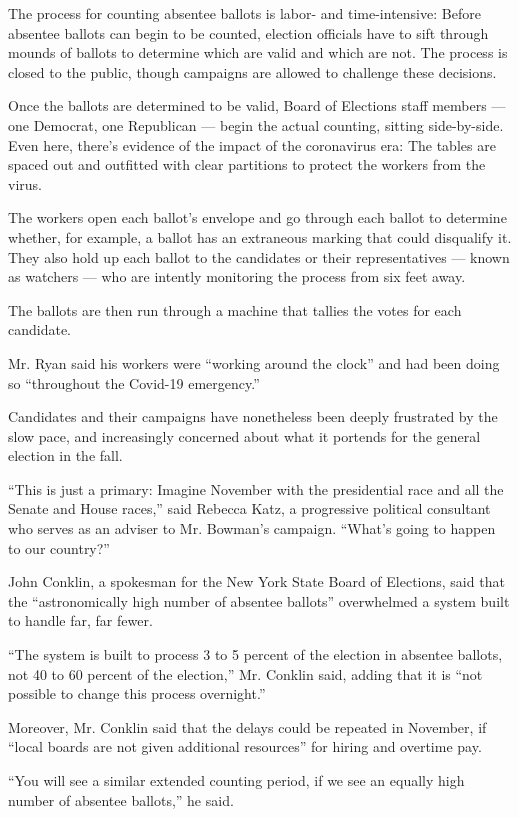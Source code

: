 The process for counting absentee ballots is labor- and time-intensive:
Before absentee ballots can begin to be counted, election officials have
to sift through mounds of ballots to determine which are valid and which
are not. The process is closed to the public, though campaigns are
allowed to challenge these decisions.

Once the ballots are determined to be valid, Board of Elections staff
members --- one Democrat, one Republican --- begin the actual counting,
sitting side-by-side. Even here, there's evidence of the impact of the
coronavirus era: The tables are spaced out and outfitted with clear
partitions to protect the workers from the virus.

The workers open each ballot's envelope and go through each ballot to
determine whether, for example, a ballot has an extraneous marking that
could disqualify it. They also hold up each ballot to the candidates or
their representatives --- known as watchers --- who are intently
monitoring the process from six feet away.

The ballots are then run through a machine that tallies the votes for
each candidate.

Mr. Ryan said his workers were ``working around the clock'' and had been
doing so ``throughout the Covid-19 emergency.''

Candidates and their campaigns have nonetheless been deeply frustrated
by the slow pace, and increasingly concerned about what it portends for
the general election in the fall.

``This is just a primary: Imagine November with the presidential race
and all the Senate and House races,'' said Rebecca Katz, a progressive
political consultant who serves as an adviser to Mr. Bowman's campaign.
``What's going to happen to our country?''

John Conklin, a spokesman for the New York State Board of Elections,
said that the ``astronomically high number of absentee ballots''
overwhelmed a system built to handle far, far fewer.

``The system is built to process 3 to 5 percent of the election in
absentee ballots, not 40 to 60 percent of the election,'' Mr. Conklin
said, adding that it is ``not possible to change this process
overnight.''

Moreover, Mr. Conklin said that the delays could be repeated in
November, if ``local boards are not given additional resources'' for
hiring and overtime pay.

``You will see a similar extended counting period, if we see an equally
high number of absentee ballots,'' he said.

